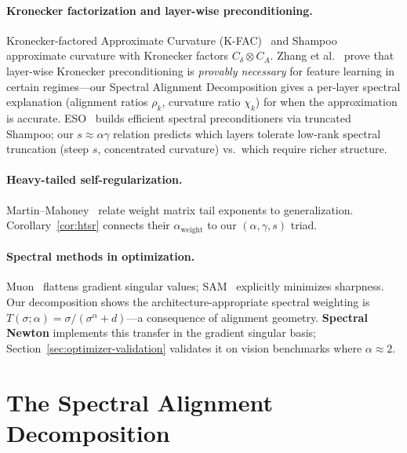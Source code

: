\documentclass{article}
\begin{document}
\paragraph{Kronecker factorization and layer-wise preconditioning.}
Kronecker-factored Approximate Curvature (K-FAC)~\cite{martens2015kfac,grosse2016kfc} and Shampoo~\cite{gupta2018shampoo} approximate curvature with Kronecker factors $C_\delta \otimes C_A$. Zhang et al.~\cite{zhang2025concurrence} prove that layer-wise Kronecker preconditioning is \emph{provably necessary} for feature learning in certain regimes---our Spectral Alignment Decomposition gives a per-layer spectral explanation (alignment ratios $\rho_k$, curvature ratio $\chi_k$) for when the approximation is accurate. ESO~\cite{chen2026eso} builds efficient spectral preconditioners via truncated Shampoo; our $s \approx \alpha\gamma$ relation predicts which layers tolerate low-rank spectral truncation (steep $s$, concentrated curvature) vs.\ which require richer structure.

\paragraph{Heavy-tailed self-regularization.}
Martin--Mahoney~\cite{martin2021implicit} relate weight matrix tail exponents to generalization. Corollary~\ref{cor:htsr} connects their $\alpha_{\mathrm{weight}}$ to our $(\alpha, \gamma, s)$ triad.

\paragraph{Spectral methods in optimization.}
Muon~\cite{jordan2024muon} flattens gradient singular values; SAM~\cite{foret2021sam} explicitly minimizes sharpness. Our decomposition shows the architecture-appropriate spectral weighting is $T(\sigma;\alpha) = \sigma/(\sigma^\alpha + d)$---a consequence of alignment geometry. \textbf{Spectral Newton} implements this transfer in the gradient singular basis; Section~\ref{sec:optimizer-validation} validates it on vision benchmarks where $\alpha \approx 2$.

\section{The Spectral Alignment Decomposition}\label{sec:decomposition}
\end{document}

